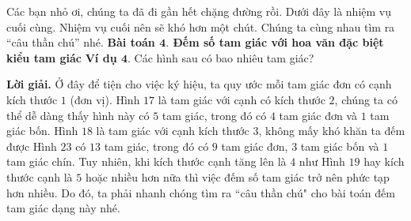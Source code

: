 \newpage
{}
\graphicspath{{../timhieucungbi/demtamgiac2/}}

Các bạn nhỏ ơi, chúng ta đã đi gần hết chặng đường rồi. Dưới đây là nhiệm vụ cuối cùng. Nhiệm vụ cuối nên sẽ khó hơn một chút. Chúng ta cùng nhau tìm ra “câu thần chú” nhé. 
\vskip 0.1cm
{\bf\color{toancuabi} Bài toán $\pmb{4.}$ Đếm số tam giác với hoa văn đặc biệt kiểu tam giác}
\vskip 0.1cm
{\bf\color{toancuabi} Ví dụ $\pmb{4.}$} Các hình sau có bao nhiêu tam giác?
	\begin{figure}[H]
	\centering
	\vspace*{-5pt}
	\captionsetup{labelformat= empty, justification=centering}
	\captionsetup[subfigure]{labelformat=empty}
	\hfill{}
	\hfill
	\hfill{}
	\hfill
	\vspace*{-10pt}
\end{figure}
{\bf\color{toancuabi} Lời giải.}
\vskip 0.1cm
Ở đây để tiện cho việc ký hiệu, ta quy ước mỗi tam giác đơn có cạnh kích thước $1$ (đơn vị).
\vskip 0.1cm
Hình $17$ là tam giác với cạnh có kích thước $2$, chúng ta có thể dễ dàng thấy hình này có $5$ tam giác, trong đó có $4$ tam giác đơn và $1$ tam giác bốn.
\vskip 0.1cm
Hình $18$ là tam giác với cạnh kích thước $3$, không mấy khó khăn ta đếm được Hình $23$ có $13$ tam giác, trong đó có $9$ tam giác đơn, $3$ tam giác bốn và $1$ tam giác chín.
\vskip 0.1cm
Tuy nhiên, khi kích thước cạnh tăng lên là $4$ như Hình $19$ hay kích thước cạnh là $5$ hoặc nhiều hơn nữa thì việc đếm số tam giác trở nên phức tạp hơn nhiều. Do đó, ta phải nhanh chóng tìm ra ``câu thần chú" cho bài toán đếm tam giác dạng này nhé. 
